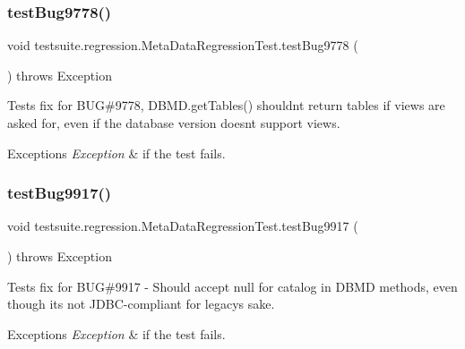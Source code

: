 \subsubsection{\texorpdfstring{test\+Bug9778()}{testBug9778()}}
{\footnotesize\ttfamily void testsuite.\+regression.\+Meta\+Data\+Regression\+Test.\+test\+Bug9778 (\begin{DoxyParamCaption}{ }\end{DoxyParamCaption}) throws Exception}

Tests fix for B\+UG\#9778, D\+B\+M\+D.\+get\+Tables() shouldn\textquotesingle{}t return tables if views are asked for, even if the database version doesn\textquotesingle{}t support views.


\begin{DoxyExceptions}{Exceptions}
{\em Exception} & if the test fails. \\
\hline
\end{DoxyExceptions}
\mbox{\label{classtestsuite_1_1regression_1_1_meta_data_regression_test_a091172fd69f6c74846e6d1d59d889924}} 
\subsubsection{\texorpdfstring{test\+Bug9917()}{testBug9917()}}
{\footnotesize\ttfamily void testsuite.\+regression.\+Meta\+Data\+Regression\+Test.\+test\+Bug9917 (\begin{DoxyParamCaption}{ }\end{DoxyParamCaption}) throws Exception}

Tests fix for B\+UG\#9917 -\/ Should accept null for catalog in D\+B\+MD methods, even though it\textquotesingle{}s not J\+D\+B\+C-\/compliant for legacy\textquotesingle{}s sake.


\begin{DoxyExceptions}{Exceptions}
{\em Exception} & if the test fails. \\
\hline
\end{DoxyExceptions}
\mbox{\label{classtestsuite_1_1regression_1_1_meta_data_regression_test_aff18615ce9761d601ce3bfbf73901c2a}} 
